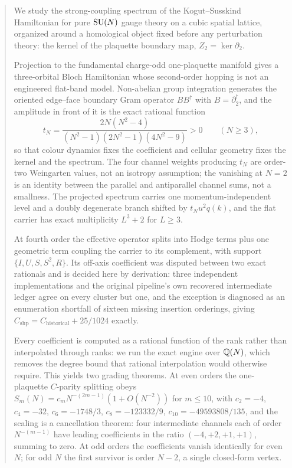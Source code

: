 \begin{abstract}
\noindent
We study the strong-coupling spectrum of the Kogut--Susskind
Hamiltonian for pure $\SU(N)$ gauge theory on a cubic spatial lattice,
organized around a homological object fixed before any perturbation
theory: the kernel of the plaquette boundary map,
$Z_2 = \ker\partial_2$.

Projection to the fundamental charge-odd one-plaquette manifold gives a
three-orbital Bloch Hamiltonian whose second-order hopping is not an
engineered flat-band model. Non-abelian group integration generates the
oriented edge--face boundary Gram operator $BB^{\dagger}$ with
$B = \partial_2^{\dagger}$, and the amplitude in front of it is the
exact rational function
\[
  t_N = \frac{2N(N^2-4)}{(N^2-1)(2N^2-1)(4N^2-9)} > 0
  \qquad (N \ge 3),
\]
so that colour dynamics fixes the coefficient and cellular geometry
fixes the kernel and the spectrum. The four channel weights producing
$t_N$ are order-two Weingarten values, not an isotropy assumption; the
vanishing at $N = 2$ is an identity between the parallel and
antiparallel channel sums, not a smallness. The projected spectrum
carries one momentum-independent level and a doubly degenerate branch
shifted by $t_N u^2 q(k)$, and the flat carrier has exact multiplicity
$L^3 + 2$ for $L \ge 3$.

At fourth order the effective operator splits into Hodge terms plus one
geometric term coupling the carrier to its complement, with support
$\{I, U, S, S^2, R\}$. Its off-axis coefficient was disputed between
two exact rationals and is decided here by derivation: three
independent implementations and the original pipeline's own recovered
intermediate ledger agree on every cluster but one, and the exception is
diagnosed as an enumeration shortfall of sixteen missing insertion
orderings, giving
$C_{\mathrm{shp}} = C_{\mathrm{historical}} + 25/1024$ exactly.

Every coefficient is computed as a rational function of the rank rather
than interpolated through ranks: we run the exact engine over $\Q(N)$,
which removes the degree bound that rational interpolation would
otherwise require. This yields two grading theorems. At even orders the
one-plaquette $C$-parity splitting obeys
$S_m(N) = c_m N^{-(2m-1)}(1 + O(N^{-2}))$ for $m \le 10$, with
$c_2 = -4$, $c_4 = -32$, $c_6 = -1748/3$, $c_8 = -123332/9$,
$c_{10} = -49593808/135$, and the scaling is a cancellation theorem:
four intermediate channels each of order $N^{-(m-1)}$ have leading
coefficients in the ratio $(-4,+2,+1,+1)$, summing to zero. At odd
orders the coefficients vanish identically for even $N$; for odd $N$ the
first survivor is order $N-2$, a single closed-form vertex.


\end{abstract}
